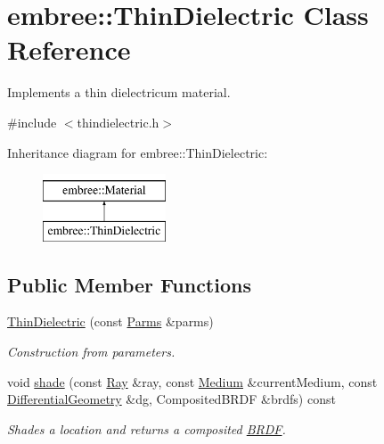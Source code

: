 \hypertarget{classembree_1_1_thin_dielectric}{
\section{embree::ThinDielectric Class Reference}
\label{classembree_1_1_thin_dielectric}
}


Implements a thin dielectricum material.  




{\ttfamily \#include $<$thindielectric.h$>$}

Inheritance diagram for embree::ThinDielectric:\begin{figure}[H]
\begin{center}
\leavevmode
\includegraphics[height=2.000000cm]{classembree_1_1_thin_dielectric}
\end{center}
\end{figure}
\subsection*{Public Member Functions}
\begin{DoxyCompactItemize}
\item 
\hyperlink{classembree_1_1_thin_dielectric_a6d352da646ebe0a86391cd595445fac0}{ThinDielectric} (const \hyperlink{classembree_1_1_parms}{Parms} \&parms)
\begin{DoxyCompactList}\small\item\em Construction from parameters. \item\end{DoxyCompactList}\item 
\hypertarget{classembree_1_1_thin_dielectric_a20eb8f2855e1b6c0220491841834b741}{
void \hyperlink{classembree_1_1_thin_dielectric_a20eb8f2855e1b6c0220491841834b741}{shade} (const \hyperlink{structembree_1_1_ray}{Ray} \&ray, const \hyperlink{classembree_1_1_medium}{Medium} \&currentMedium, const \hyperlink{structembree_1_1_differential_geometry}{DifferentialGeometry} \&dg, CompositedBRDF \&brdfs) const }
\label{classembree_1_1_thin_dielectric_a20eb8f2855e1b6c0220491841834b741}

\begin{DoxyCompactList}\small\item\em Shades a location and returns a composited \hyperlink{classembree_1_1_b_r_d_f}{BRDF}. \item\end{DoxyCompactList}\end{DoxyCompactItemize}


